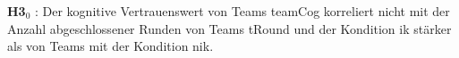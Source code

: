 \documentclass[a4paper,11pt]{article}%
\renewcommand{\\}{\vspace*{0.5\baselineskip} \newline}
\begin{document}
\textbf{H3$_{0}$} : Der kognitive Vertrauenswert von Teams \ac{teamCog} korreliert nicht mit der Anzahl abgeschlossener Runden von Teams \ac{tRound} und der Kondition \ac{ik} stärker als von Teams mit der Kondition \ac{nik}. \\
%
%
%
%
%
%
%
%
%
%
\end{document}
